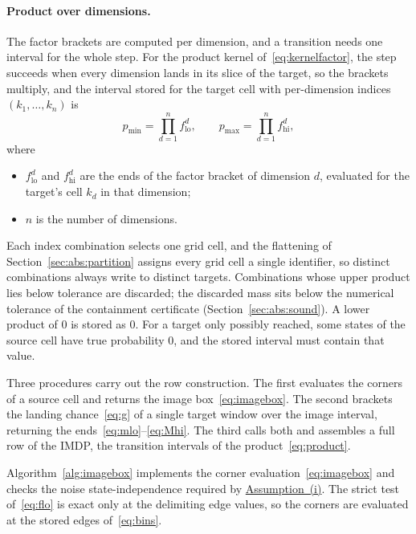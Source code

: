 \documentclass[11pt,a4paper]{article}
\theoremstyle{plain}
\theoremstyle{remark}
\begin{document}
	\paragraph{Product over dimensions.}
	The factor brackets are computed per dimension, and a transition
	needs one interval for the whole step. For the product kernel
	of~\eqref{eq:kernelfactor}, the step succeeds when every dimension
	lands in its slice of the target, so the brackets multiply, and the
	interval stored for the target cell with per-dimension indices
	$(k_1, \dots, k_n)$ is
	\begin{equation}
		p_{\min} = \prod_{d=1}^{n} f^{d}_{\text{lo}}, \qquad
		p_{\max} = \prod_{d=1}^{n} f^{d}_{\text{hi}},
		\label{eq:product}
	\end{equation}
	where
	\begin{itemize}
		\item $f^{d}_{\text{lo}}$ and $f^{d}_{\text{hi}}$ are the ends of the
		factor bracket of dimension $d$, evaluated for the target's cell
		$k_d$ in that dimension;
		\item $n$ is the number of dimensions.
	\end{itemize}
	Each index combination selects one grid cell, and the flattening of
	Section~\ref{sec:abs:partition} assigns every grid cell a single
	identifier, so distinct combinations always write to distinct
	targets. Combinations whose upper product lies below tolerance are
	discarded; the discarded mass sits below the numerical tolerance of
	the containment certificate (Section~\ref{sec:abs:sound}). A lower
	product of $0$ is stored as $0$. For a target only possibly reached,
	some states of the source cell have true probability $0$, and the
	stored interval must contain that value.\newline
	

	Three procedures carry out the row construction. The first evaluates
	the corners of a source cell and returns the image
	box~\eqref{eq:imagebox}. The second brackets the landing
	chance~\eqref{eq:g} of a single target window over the image
	interval, returning the ends~\eqref{eq:mlo}--\eqref{eq:Mhi}. The
	third calls both and assembles a full row of the IMDP, the transition
	intervals of the product~\eqref{eq:product}. \newline
	
	Algorithm~\ref{alg:imagebox} implements the corner
	evaluation~\eqref{eq:imagebox} and checks the noise
	state-independence required by
	\hyperref[ass:sysclass]{Assumption~(i)}. The strict test
	of~\eqref{eq:flo} is exact only at the delimiting edge values, so the
	corners are evaluated at the stored edges of~\eqref{eq:bins}.
	
\end{document}
